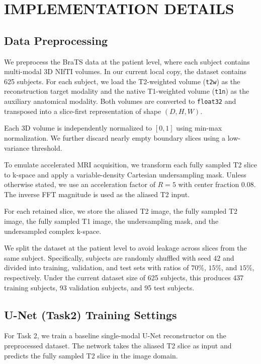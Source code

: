 \section{IMPLEMENTATION DETAILS}
\label{sec:implementation_details}

\subsection{Data Preprocessing}
\label{sec:data_preprocessing}

We preprocess the BraTS data at the patient level, where each subject contains multi-modal 3D NIfTI volumes. In our current local copy, the dataset contains 625 subjects. For each subject, we load the T2-weighted volume (\texttt{t2w}) as the reconstruction target modality and the native T1-weighted volume (\texttt{t1n}) as the auxiliary anatomical modality. Both volumes are converted to \texttt{float32} and transposed into a slice-first representation of shape $(D, H, W)$.

Each 3D volume is independently normalized to $[0,1]$ using min-max normalization. We further discard nearly empty boundary slices using a low-variance threshold.

To emulate accelerated MRI acquisition, we transform each fully sampled T2 slice to k-space and apply a variable-density Cartesian undersampling mask. Unless otherwise stated, we use an acceleration factor of $R=5$ with center fraction $0.08$. The inverse FFT magnitude is used as the aliased T2 input.

For each retained slice, we store the aliased T2 image, the fully sampled T2 image, the fully sampled T1 image, the undersampling mask, and the undersampled complex k-space.

We split the dataset at the patient level to avoid leakage across slices from the same subject. Specifically, subjects are randomly shuffled with seed $42$ and divided into training, validation, and test sets with ratios of $70\%$, $15\%$, and $15\%$, respectively. Under the current dataset size of 625 subjects, this produces 437 training subjects, 93 validation subjects, and 95 test subjects.

\subsection{U-Net (Task2) Training Settings}
\label{sec:unet_training_settings}

For Task 2, we train a baseline single-modal U-Net reconstructor on the preprocessed dataset. The network takes the aliased T2 slice as input and predicts the fully sampled T2 slice in the image domain.

